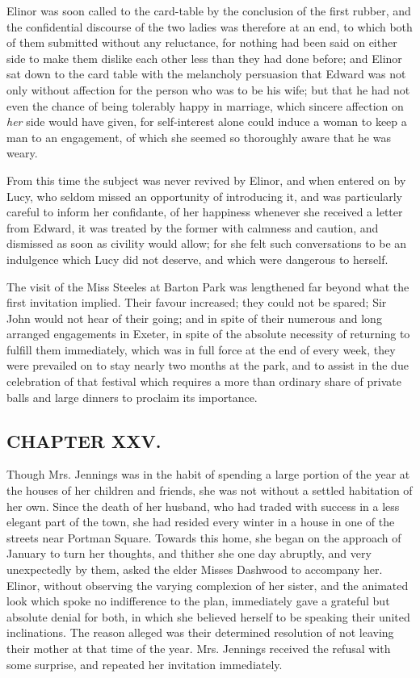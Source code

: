 Elinor was soon called to the card-table by the conclusion of the first rubber, and the confidential discourse of the two ladies was therefore at an end, to which both of them submitted without any reluctance, for nothing had been said on either side to make them dislike each other less than they had done before; and Elinor sat down to the card table with the melancholy persuasion that Edward was not only without affection for the person who was to be his wife; but that he had not even the chance of being tolerably happy in marriage, which sincere affection on {\em her} side would have given, for self-interest alone could induce a woman to keep a man to an engagement, of which she seemed so thoroughly aware that he was weary.

From this time the subject was never revived by Elinor, and when entered on by Lucy, who seldom missed an opportunity of introducing it, and was particularly careful to inform her confidante, of her happiness whenever she received a letter from Edward, it was treated by the former with calmness and caution, and dismissed as soon as civility would allow; for she felt such conversations to be an indulgence which Lucy did not deserve, and which were dangerous to herself.

The visit of the Miss Steeles at Barton Park was lengthened far beyond what the first invitation implied. Their favour increased; they could not be spared; Sir John would not hear of their going; and in spite of their numerous and long arranged engagements in Exeter, in spite of the absolute necessity of returning to fulfill them immediately, which was in full force at the end of every week, they were prevailed on to stay nearly two months at the park, and to assist in the due celebration of that festival which requires a more than ordinary share of private balls and large dinners to proclaim its importance.

\subsection[chapter-xxv.]{\useURL[url25][][][]\from[url25]CHAPTER XXV.}

Though Mrs. Jennings was in the habit of spending a large portion of the year at the houses of her children and friends, she was not without a settled habitation of her own. Since the death of her husband, who had traded with success in a less elegant part of the town, she had resided every winter in a house in one of the streets near Portman Square. Towards this home, she began on the approach of January to turn her thoughts, and thither she one day abruptly, and very unexpectedly by them, asked the elder Misses Dashwood to accompany her. Elinor, without observing the varying complexion of her sister, and the animated look which spoke no indifference to the plan, immediately gave a grateful but absolute denial for both, in which she believed herself to be speaking their united inclinations. The reason alleged was their determined resolution of not leaving their mother at that time of the year. Mrs. Jennings received the refusal with some surprise, and repeated her invitation immediately.


